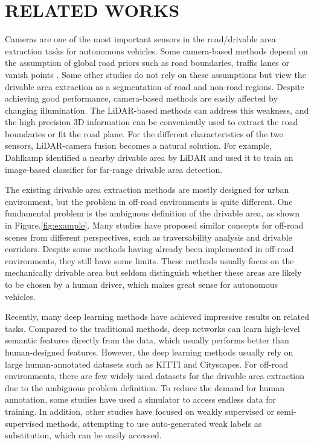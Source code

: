 \documentclass[letterpaper, 10 pt, conference]{ieeeconf}  %
\begin{document}
\section{RELATED WORKS}	\label{sec:relatedworks}
Cameras are one of the most important sensors in the road/drivable area extraction tasks for autonomous vehicles. Some camera-based methods depend on the assumption of global road priors such as road boundaries\cite{Yuan2015},
traffic lanes\cite{Aly2014}\cite{ZuWhanKim2008} or
vanish points\cite{Alvarez2014}\cite{Audibert2010}
. Some other studies do not rely on these assumptions but view the drivable area extraction as a segmentation of road and non-road regions\cite{Mei2018}\cite{Zhou2010}.
Despite achieving good performance, camera-based methods are easily affected by changing illumination. 
The LiDAR-based methods can address this weakness, and the high precision 3D information can be conveniently used to extract the road boundaries\cite{Zhang2010}\cite{Wijesoma2004}\cite{Zhang2018} or fit the road plane\cite{Asvadi2016}\cite{Hu2014}. For the different characteristics of the two sensors, LiDAR-camera fusion becomes a natural solution. For example, Dahlkamp\cite{Stanford2006} identified a nearby drivable area by LiDAR and used it to train an image-based classifier for far-range drivable area detection.

The existing drivable area extraction methods are mostly designed for urban environment, but the problem in off-road environments is quite different. One fundamental problem is the ambiguous definition of the drivable area, as shown in Figure.\ref{fig:example}. Many studies have proposed similar concepts for off-road scenes from different perspectives, such as traversability analysis\cite{Suger2015} and drivable corridors\cite{Nefian2006}.
Despite some methods having already been implemented in off-road environments\cite{Audibert2010}\cite{Stanford2006}\cite{Nefian2006}, they still have some limits. These methods usually focus on the mechanically drivable area but seldom distinguish whether these areas are likely to be chosen by a human driver, which makes great sense for autonomous vehicles.


Recently, many deep learning methods have achieved impressive results on related tasks\cite{barnes2017find}\cite{Han2018}\cite{Oliveira2016}\cite{chen2015deepdriving}\cite{Bellone2018}. Compared to the traditional methods, deep networks can learn high-level semantic features directly from the data, which usually performs better than human-designed features.
However, the deep learning methods usually rely on large human-annotated datasets such as KITTI\cite{geiger2013vision} and Cityscapes\cite{cordts2016cityscapes}. For off-road environments, there are few widely used datasets for the drivable area extraction due to the ambiguous problem definition. 
To reduce the demand for human annotation, some studies have used a simulator to access endless data for training\cite{chen2015deepdriving}. In addition, other studies have focused on weakly supervised\cite{barnes2017find} or semi-supervised methods\cite{Suger2015}, attempting to use auto-generated weak labels as substitution, which can be easily accessed.
\end{document}
